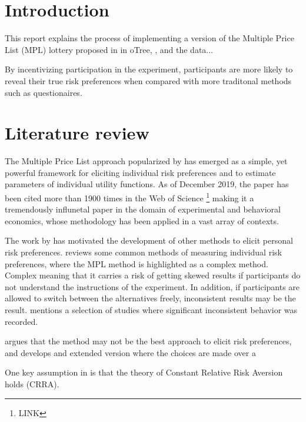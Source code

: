 \documentclass [12pt,a4paper,oneside]{article}
\begin{document}
\section{Introduction}\label{sec:introduction}

This report explains the process of implementing a version of the Multiple Price List (MPL) lottery proposed in \cite{holt_risk_2002} in oTree, \textcite{chen_otreeopen-source_2016}, and the data...

By incentivizing participation in the experiment, participants are more likely to reveal their true risk preferences when compared with more traditonal methods such as questionaires. 
  


\section{Literature review}
The Multiple Price List approach popularized by \textcite{holt_risk_2002} has emerged as a simple, yet powerful framework for eliciting individual risk preferences and to estimate parameters of individual utility functions. As of December 2019, the paper has been cited more than 1900 times in the Web of Science \footnote{LINK} making it a tremendously influnetal paper in the domain of experimental and behavioral economics, whose methodology has been applied in a vast array of contexts. 


The work by \textcite{holt_risk_2002} has motivated the development of other methods to elicit personal risk preferences. \textcite{charness_experimental_2013-1} reviews some common methods of measuring individual risk preferences, where the MPL method is highlighted as a complex method. Complex meaning that it carries a risk of getting skewed results if participants do not understand the instructions of the experiment. In addition, if participants are allowed to switch between the alternatives freely, inconsistent results may be the result. \textcite{charness_experimental_2013-1} mentions a selection of studies where significant inconsistent behavior was recorded. 

\textcite{drichoutis_what_2016-2} argues that the \textcite{holt_risk_2002} method may not be the best approach to elicit risk preferences, and develops and extended version where the choices are made over a 





One key assumption in \textcite{holt_risk_2002} is that the theory of Constant Relative Risk Aversion holds (CRRA). 
\end{document}
